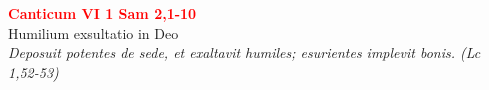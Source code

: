 


\def\greinitialformat#1{%
{\fontsize{39}{39}\selectfont #1}%
}




\vspace{0.3cm}
\begin{center}
 \textcolor{red}{\large \bf Canticum VI 1 Sam 2,1-10}\\
Humilium exsultatio in Deo\\
\textit{\small Deposuit potentes de sede, et exaltavit humiles; esurientes implevit bonis. (Lc 1,52-53)}
\end{center}
